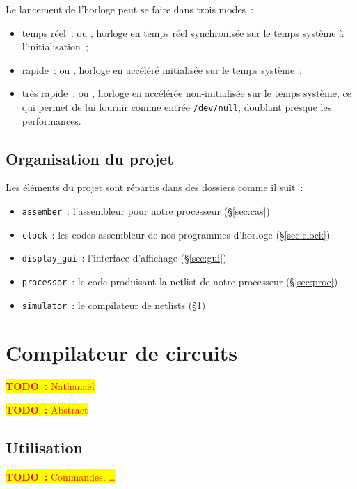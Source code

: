 \documentclass[11pt,a4paper]{article}
\newcommand{\htodo}[1]{\begin{huge}\colorbox{yellow}{\textcolor{red}{\textbf{TODO~:} #1}}\end{huge}}
\newcommand{\todo}[1]{\colorbox{yellow}{\textcolor{red}{\textbf{TODO~:} #1}}}
\begin{document}
Le lancement de l'horloge peut se faire dans trois modes~:
\begin{itemize}
\item temps réel~:  ou , horloge en temps réel synchronisée sur le temps système à l'initialisation~;
\item rapide~:  ou , horloge en accéléré initialisée sur le temps système~;
\item très rapide~:  ou , horloge en accélérée non-initialisée sur le temps système, ce qui permet de lui fournir comme entrée \texttt{/dev/null}, doublant presque les performances.
\end{itemize}

\subsection{Organisation du projet}

Les éléments du projet sont répartis dans des dossiers comme il suit~:
\begin{itemize}
\item \texttt{assember}~: l'assembleur pour notre processeur (§\ref{sec:cas})
\item \texttt{clock}~: les codes assembleur de nos programmes d'horloge (§\ref{sec:clock})
\item \texttt{display\_gui}~: l'interface d'affichage (§\ref{sec:gui})
\item \texttt{processor}~: le code produisant la netlist de notre processeur (§\ref{sec:proc})
\item \texttt{simulator}~: le compilateur de netlists (§\ref{sec:compilo})
\end{itemize}

\section{Compilateur de circuits} \label{sec:compilo}

\htodo{Nathanaël}

\todo{Abstract}

\subsection{Utilisation}
\todo{Commandes, \ldots}
\end{document}
